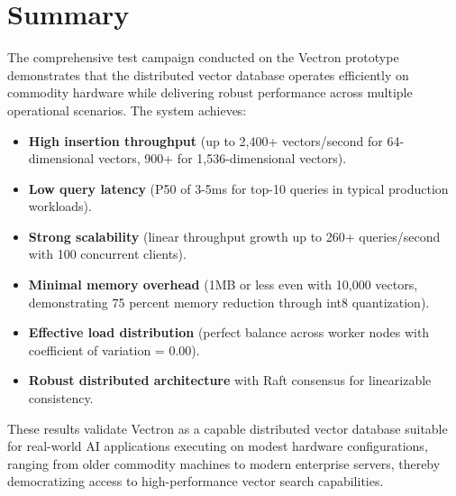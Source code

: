 \section{Summary}

The comprehensive test campaign conducted on the Vectron prototype demonstrates that the distributed vector database operates efficiently on commodity hardware while delivering robust performance across multiple operational scenarios. The system achieves:

\begin{itemize}
    \item \textbf{High insertion throughput} (up to 2,400+ vectors/second for 64-dimensional vectors, 900+ for 1,536-dimensional vectors).
    \item \textbf{Low query latency} (P50 of 3-5ms for top-10 queries in typical production workloads).
    \item \textbf{Strong scalability} (linear throughput growth up to 260+ queries/second with 100 concurrent clients).
    \item \textbf{Minimal memory overhead} (1MB or less even with 10,000 vectors, demonstrating 75 percent memory reduction through int8 quantization).
    \item \textbf{Effective load distribution} (perfect balance across worker nodes with coefficient of variation = 0.00).
    \item \textbf{Robust distributed architecture} with Raft consensus for linearizable consistency.
\end{itemize}

These results validate Vectron as a capable distributed vector database suitable for real-world AI applications executing on modest hardware configurations, ranging from older commodity machines to modern enterprise servers, thereby democratizing access to high-performance vector search capabilities.